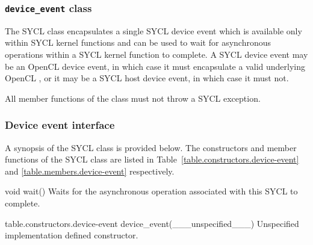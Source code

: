 \subsubsection{\texttt{device_event} class}
\label{device-event-class}

The SYCL  class encapsulates a single SYCL device event
which is available only within SYCL kernel functions and can be used to wait for
asynchronous operations within a SYCL kernel function to complete. A SYCL device
event may be an OpenCL device event, in which case it must encapsulate a valid
underlying OpenCL , or it may be a SYCL host device event,
in which case it must not.

All member functions of the  class must not throw a
SYCL exception.

\subsubsection{Device event interface}

A synopsis of the SYCL  class is provided below. The
constructors and member functions of the SYCL  class
are listed in Table~\ref{table.constructors.device-event} and
\ref{table.members.device-event} respectively.



  \addRow
    { void wait() }
    {
      Waits for the asynchronous operation associated with this SYCL
       to complete.
    }
\completeTable

{table.constructors.device-event}
  \addRow
    {device_event(___unspecified___)}
    {
      Unspecified implementation defined constructor.
    }
\completeTable

